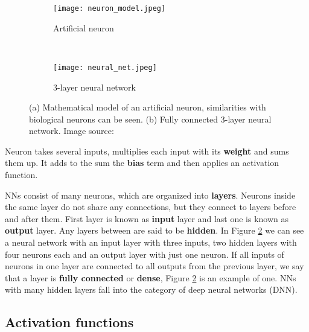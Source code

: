 \begin{figure}[ht] 
    \begin{subfigure}[b]{0.5\textwidth}
        \centering
        \texttt{[image: neuron\_model.jpeg]} 
        \caption{Artificial neuron}
        \label{neuron_model}
    \end{subfigure}
    \unskip\ \vrule\ 
    \begin{subfigure}[b]{0.5\textwidth}
        \centering
        \texttt{[image: neural\_net.jpeg]} 
        \caption{ 3-layer neural network}
        \label{neural_net}
    \end{subfigure}
    
    \caption[Mathematical model of artificial neuron and fully connected 3-layer neural network.]{(a) Mathematical model of an artificial neuron, similarities with biological neurons can be seen. (b) Fully connected 3-layer neural network. Image source: \cite{cs231n}}
    \label{neural}
\end{figure}

Neuron takes several inputs, multiplies each input with its \textbf{weight} and sums them up.
It adds to the sum the \textbf{bias} term and then applies an activation function.

NNs consist of many neurons, which are organized into \textbf{layers}.
Neurons inside the same layer do not share any connections, but they connect to layers before and after them.
First layer is known as \textbf{input} layer and last one is known as \textbf{output} layer. 
Any layers between are said to be \textbf{hidden}. 
In Figure \ref{neural_net} we can see a neural network with an input layer with three inputs, two hidden layers with four neurons each and an output layer with just one neuron.
If all inputs of neurons in one layer are connected to all outputs from the previous layer, we say that a layer is \textbf{fully connected} or \textbf{dense}, Figure \ref{neural_net} is an example of one.
NNs with many hidden layers fall into the category of deep neural networks (DNN).


\subsection{ Activation functions}

